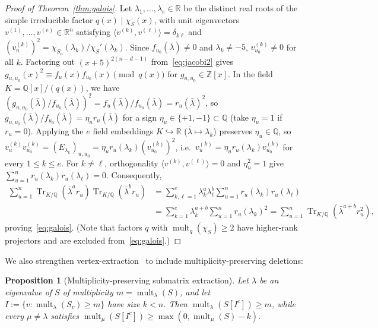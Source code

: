 \documentclass[11pt,reqno]{amsart}
\newtheorem{proposition}[theorem]{Proposition}
\theoremstyle{definition}
\theoremstyle{remark}
\DeclareMathOperator{\mult}{mult}
\DeclareMathOperator{\Tr}{Tr}
\begin{document}
\begin{proof}[Proof of Theorem~\ref{thm:galois}]
Let $\lambda_1, \dots, \lambda_e \in \mathbb{R}$ be the distinct real roots of the simple irreducible factor $q(x) \mid \chi_S(x)$, with unit eigenvectors $v^{(1)}, \dots, v^{(e)} \in \mathbb{R}^n$ satisfying $\langle v^{(k)}, v^{(\ell)} \rangle = \delta_{k\ell}$ and $(v^{(k)}_u)^2 = \chi_{S_u}(\lambda_k)/\chi_S'(\lambda_k)$. Since $f_{u_0}(\bar{\lambda}) \neq 0$ and $\lambda_k \neq -5$, $v^{(k)}_{u_0} \neq 0$ for all $k$. Factoring out $(x+5)^{2(n-d-1)}$ from~\eqref{eq:jacobi2} gives $g_{u, u_0}(x)^2 \equiv f_u(x) f_{u_0}(x) \pmod{q(x)}$ for $g_{u, u_0} \in \mathbb{Z}[x]$. In the field $K = \mathbb{Q}[x]/(q(x))$, we have $(g_{u, u_0}(\bar{\lambda}) / f_{u_0}(\bar{\lambda}))^2 = f_u(\bar{\lambda})/f_{u_0}(\bar{\lambda}) = r_u(\bar{\lambda})^2$, so $g_{u, u_0}(\bar{\lambda})/f_{u_0}(\bar{\lambda}) = \eta_u r_u(\bar{\lambda})$ for a sign $\eta_u \in \{+1, -1\} \subset \mathbb{Q}$ (take $\eta_u = 1$ if $r_u = 0$). Applying the $e$ field embeddings $K \hookrightarrow \mathbb{R}$ ($\bar{\lambda} \mapsto \lambda_k$) preserves $\eta_u \in \mathbb{Q}$, so $v^{(k)}_u v^{(k)}_{u_0} = (E_{\lambda_k})_{u, u_0} = \eta_u r_u(\lambda_k) (v^{(k)}_{u_0})^2$, i.e.\ $v^{(k)}_u = \eta_u r_u(\lambda_k) v^{(k)}_{u_0}$ for every $1 \le k \le e$. For $k \neq \ell$, orthogonality $\langle v^{(k)}, v^{(\ell)} \rangle = 0$ and $\eta_u^2 = 1$ give $\sum_{u=1}^n r_u(\lambda_k) r_u(\lambda_\ell) = 0$. Consequently,
\begin{align*}
  \sum_{u=1}^n \Tr_{K/\mathbb{Q}}(\bar{\lambda}^a r_u)\Tr_{K/\mathbb{Q}}(\bar{\lambda}^b r_u)
  &= \sum_{k,\ell=1}^e \lambda_k^a \lambda_\ell^b \sum_{u=1}^n r_u(\lambda_k) r_u(\lambda_\ell) \\
  &= \sum_{k=1}^e \lambda_k^{a+b} \sum_{u=1}^n r_u(\lambda_k)^2
  = \sum_{u=1}^n \Tr_{K/\mathbb{Q}}(\bar{\lambda}^{a+b} r_u^2),
\end{align*}
proving~\eqref{eq:galois}. (Note that factors $q$ with $\mult_q(\chi_S) \ge 2$ have higher-rank projectors and are excluded from~\eqref{eq:galois}.)
\end{proof}

We also strengthen vertex-extraction~\cite[Lem.~2.10]{GS2024} to include multiplicity-preserving deletions:

\begin{proposition}[Multiplicity-preserving submatrix extraction]\label{prop:prop61}
Let $\lambda$ be an eigenvalue of $S$ of multiplicity $m = \mult_\lambda(S)$, and let $I := \{v : \mult_\lambda(S_v) \ge m\}$ have size $k < n$. Then $\mult_\lambda(S[I^c]) \ge m$, while every $\mu \neq \lambda$ satisfies $\mult_\mu(S[I^c]) \ge \max(0, \mult_\mu(S) - k)$.
\end{proposition}
\end{document}
